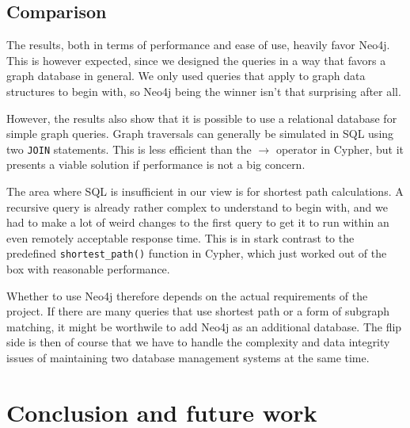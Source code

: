 \documentclass[11pt, a4paper,oneside,chapterprefix=false]{scrbook}
\begin{document}
\section{Comparison}


The results, both in terms of performance and ease of use, heavily favor Neo4j.
This is however expected, since we designed the queries in a way that favors a graph database in general.
We only used queries that apply to graph data structures to begin with, so Neo4j being the winner isn't that surprising after all.

However, the results also show that it is possible to use a relational database for simple graph queries.
Graph traversals can generally be simulated in SQL using two \lstinline{JOIN} statements.
This is less efficient than the $\rightarrow$ operator in Cypher, but it presents a viable solution if performance is not a big concern.

The area where SQL is insufficient in our view is for shortest path calculations.
A recursive query is already rather complex to understand to begin with, and we had to make a lot of weird changes to the first query to get it to run within an even remotely acceptable response time.
This is in stark contrast to the predefined \lstinline{shortest_path()} function in Cypher, which just worked out of the box with reasonable performance.

Whether to use Neo4j therefore depends on the actual requirements of the project.
If there are many queries that use shortest path or a form of subgraph matching, it might be worthwile to add Neo4j as an additional database.
The flip side is then of course that we have to handle the complexity and data integrity issues of maintaining two database management systems at the same time.

\chapter{Conclusion and future work} \label{chp:conclusion}
\end{document}
